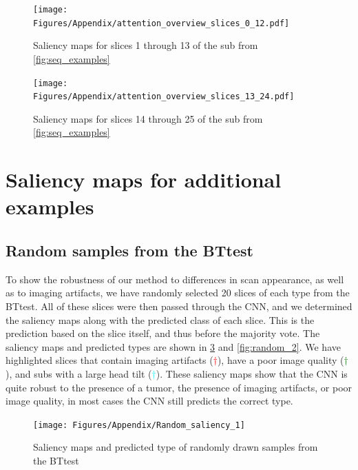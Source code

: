 \begin{subappendices}
\begin{figure}[ht]
\texttt{[image: Figures/Appendix/attention\_overview\_slices\_0\_12.pdf]}
\caption{Saliency maps for \glspl{slice} \num{1} through \num{13} of the \gls{sub} from \cref{fig:seq_examples}}
\label{fig:saliency_lower_slices}
\end{figure}

\begin{figure}[ht]
\texttt{[image: Figures/Appendix/attention\_overview\_slices\_13\_24.pdf]}
\caption{Saliency maps for \glspl{slice} \num{14} through \num{25} of the \gls{sub} from \cref{fig:seq_examples}}
\label{fig:saliency_upper_slices}
\end{figure}


\clearpage

\section{Saliency maps for additional examples}
\label{app:artifactsaliency}

\subsection{Random samples from the \gls{BTtest}}
\label{app:randomtumorsample}

To show the robustness of our method to differences in \gls{scan} appearance, as well as to imaging artifacts, we have randomly selected \num{20} \glspl{slice} of each \gls{type} from the \gls{BTtest}.
All of these \glspl{slice} were then passed through the \gls{CNN}, and we determined the saliency maps along with the predicted \gls{class} of each \gls{slice}.
This is the prediction based on the \gls{slice} itself, and thus before the majority vote.
The saliency maps and predicted \glspl{type} are shown in \cref{fig:random_1} and \cref{fig:random_2}.
We have highlighted \glspl{slice} that contain imaging artifacts (\textcolor{red}{$\dagger$}), have a poor image quality (\textcolor{green}{$\dagger$}), and \glspl{sub} with a large head tilt  (\textcolor{cyan}{$\dagger$}).
These saliency maps show that the \gls{CNN} is quite robust to the presence of a \gls{tumor}, the presence of imaging artifacts, or poor image quality, in most cases the \gls{CNN} still predicts the correct \gls{type}.


\begin{figure}[ht]
    \centering
    \texttt{[image: Figures/Appendix/Random\_saliency\_1]}

    \caption{Saliency maps and predicted \gls{type} of randomly drawn \glspl{sample} from the \gls{BTtest}}
    \label{fig:random_1}
\end{figure}


\end{subappendices}
